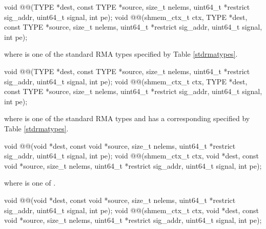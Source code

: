 \color{Green}

\begin{apidefinition}

\begin{C11synopsis}
void @@(TYPE *dest, const TYPE *source, size_t nelems, uint64_t *restrict sig_addr, uint64_t signal, int pe);
void @@(shmem_ctx_t ctx, TYPE *dest, const TYPE *source, size_t nelems, uint64_t *restrict sig_addr, uint64_t signal, int pe);
\end{C11synopsis}
where \TYPE{} is one of the standard \ac{RMA} types specified by Table \ref{stdrmatypes}.

\begin{Csynopsis}
void @@(TYPE *dest, const TYPE *source, size_t nelems, uint64_t *restrict sig_addr, uint64_t signal, int pe);
void @@(shmem_ctx_t ctx, TYPE *dest, const TYPE *source, size_t nelems, uint64_t *restrict sig_addr, uint64_t signal, int pe);
\end{Csynopsis}
where \TYPE{} is one of the standard \ac{RMA} types and has a corresponding \TYPENAME{} specified by Table \ref{stdrmatypes}.

\begin{CsynopsisCol}
void @@(void *dest, const void *source, size_t nelems, uint64_t *restrict sig_addr, uint64_t signal, int pe);
void @@(shmem_ctx_t ctx, void *dest, const void *source, size_t nelems, uint64_t *restrict sig_addr, uint64_t signal, int pe);
\end{CsynopsisCol}
where \SIZE{} is one of .

\begin{CsynopsisCol}
void @@(void *dest, const void *source, size_t nelems, uint64_t *restrict sig_addr, uint64_t signal, int pe);
void @@(shmem_ctx_t ctx, void *dest, const void *source, size_t nelems, uint64_t *restrict sig_addr, uint64_t signal, int pe);
\end{CsynopsisCol}


\end{apidefinition}
